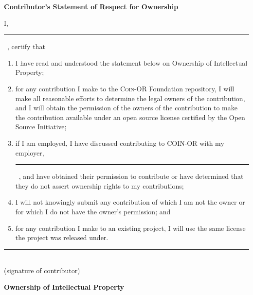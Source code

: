 \documentclass[12pt]{article}
\begin{document}
\begin{lrbox}{\csroBox}
\begin{minipage}{.9\linewidth}
\begin{center}
\textbf{Contributor's Statement of Respect for Ownership}
\end{center}
\renewcommand{\theenumi}{\alph{enumi}}
\renewcommand{\labelenumi}{(\theenumi)}
I, \rule{.5\linewidth}{.5pt}\ , certify that
\begin{enumerate}
\item I have read and understood the statement below on Ownership of
  Intellectual Property;
  
\item for any contribution I make to
  the \textsc{Coin-OR} Foundation repository, I will make all reasonable 
  efforts to determine the legal owners of the contribution, and I
  will obtain the permission of the owners of the contribution to make
  the contribution available under an open source license certified by
  the Open Source Initiative;

\item if I am employed, I have discussed contributing to COIN-OR with my
    employer, \rule{.55\linewidth}{.5pt}\ ,
    and have obtained their permission to contribute or have determined that
    they do not assert ownership rights to my contributions;

\item I will not knowingly submit any contribution of which I am not the
  owner or for which I do not have the owner's permission; and

\item for any contribution I make to an existing project, I will use
  the same license the project was released under.
\end{enumerate}
\begin{flushleft}
\begin{minipage}{.6\linewidth}\centering\vspace{2\baselineskip}
\rule{\linewidth}{.5pt} \\
(signature of contributor)
\end{minipage}
\end{flushleft}
\end{minipage}
\end{lrbox}

\bgroup\setlength{\fboxsep}{1em}
\fbox{\usebox{\csroBox}}
\egroup

\vspace{\baselineskip}
\begin{center}
\bfseries Ownership of Intellectual Property
\end{center}\vspace*{-.5\baselineskip}
\end{document}
